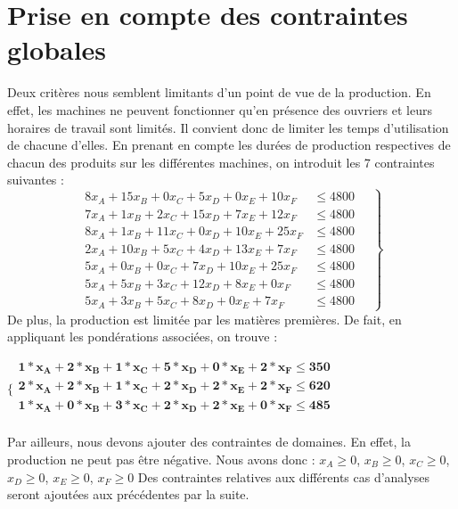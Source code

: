 \documentclass[12pt]{article}
\begin{document}
\section{Prise en compte des contraintes globales}
\label{globconst}
Deux critères nous semblent limitants d'un point de vue de la production. En effet, les machines ne peuvent fonctionner qu'en présence des ouvriers et leurs horaires de travail sont limités. Il convient donc de limiter les temps d'utilisation de chacune d'elles.
En prenant en compte les durées de production respectives de chacun des produits sur les différentes machines, on introduit les 7 contraintes suivantes :
\begin{equation*}
\left.
\begin{aligned}
    8x_{A} + 15x_{B} + 0x_{C} + 5x_{D} + 0x_{E} + 10x_{F} &\leq 4800
    \quad\\
      7x_{A} + 1x_{B} + 2x_{C} + 15x_{D} + 7x_{E} + 12x_{F} &\leq 4800 \\
      8x_{A} + 1x_{B} + 11x_{C} + 0x_{D} + 10x_{E} + 25x_{F} &\leq 4800 \\
      2x_{A} + 10x_{B} + 5x_{C} + 4x_{D} + 13x_{E} + 7x_{F} &\leq 4800 \\
      5x_{A} + 0x_{B} + 0x_{C} + 7x_{D} + 10x_{E} + 25x_{F} &\leq 4800 \\
      5x_{A} + 5x_{B} + 3x_{C} + 12x_{D} + 8x_{E} + 0x_{F} &\leq 4800 \\
      5x_{A} + 3x_{B} + 5x_{C} + 8x_{D} + 0x_{E} + 7x_{F} &\leq 4800 
\end{aligned}
\right\}
\end{equation*}
De plus, la production est limitée par les matières premières. De fait, en appliquant les pondérations associées, on trouve :
\begin{center}
$\mathbf{
   \lbrace
   \begin{array}{c}
      1 * x_{A} + 2 * x_{B} + 1 * x_{C} + 5 * x_{D} + 0 * x_{E} + 2 * x_{F}\leq 350 \\
      2 * x_{A} + 2 * x_{B} + 1 * x_{C} + 2 * x_{D} + 2 * x_{E} + 2 * x_{F} \leq 620 \\
      1 * x_{A} + 0 * x_{B} + 3 * x_{C} + 2 * x_{D} + 2 * x_{E} + 0 * x_{F} \leq 485 \\
   \end{array}
 } $ 
\end{center}

Par ailleurs, nous devons ajouter des contraintes de domaines. En effet, la production ne peut pas être négative. Nous avons donc :
$ x_{A} \geq 0$, $x_{B}  \geq 0$, $x_{C} \geq 0$, $x_{D} \geq 0$, $x_{E} \geq 0$, $x_{F} \geq 0 $
Des contraintes relatives aux différents cas d'analyses seront ajoutées aux précédentes par la suite.
\end{document}
